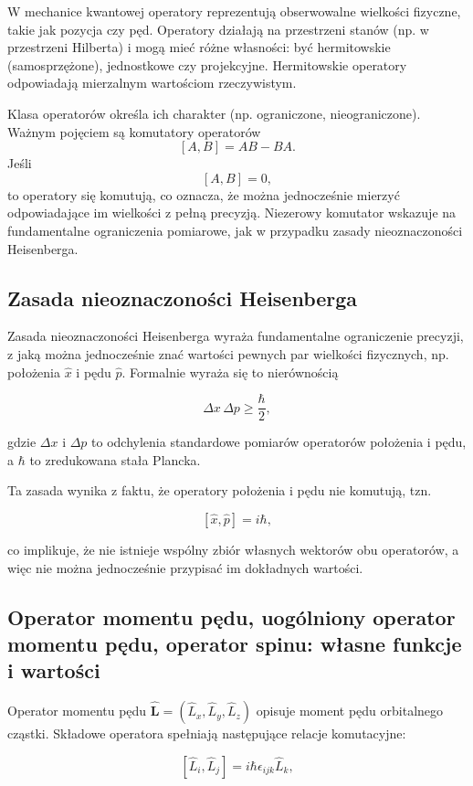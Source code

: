 W mechanice kwantowej operatory reprezentują obserwowalne wielkości fizyczne, takie jak pozycja czy pęd. Operatory działają na przestrzeni stanów (np. w przestrzeni Hilberta) i mogą mieć różne własności: być hermitowskie (samosprzężone), jednostkowe czy projekcyjne. Hermitowskie operatory odpowiadają mierzalnym wartościom rzeczywistym.

Klasa operatorów określa ich charakter (np. ograniczone, nieograniczone). Ważnym pojęciem są komutatory operatorów
\[
[A, B] = AB - BA.
\]
Jeśli
\[
[A, B] = 0,
\]
to operatory się komutują, co oznacza, że można jednocześnie mierzyć odpowiadające im wielkości z pełną precyzją. Niezerowy komutator wskazuje na fundamentalne ograniczenia pomiarowe, jak w przypadku zasady nieoznaczoności Heisenberga.

\subsection{Zasada nieoznaczoności Heisenberga}

Zasada nieoznaczoności Heisenberga wyraża fundamentalne ograniczenie precyzji, z jaką można jednocześnie znać wartości pewnych par wielkości fizycznych, np. położenia \( \hat{x} \) i pędu \( \hat{p} \). Formalnie wyraża się to nierównością

\[
\Delta x \, \Delta p \geq \frac{\hbar}{2},
\]

gdzie \( \Delta x \) i \( \Delta p \) to odchylenia standardowe pomiarów operatorów położenia i pędu, a \( \hbar \) to zredukowana stała Plancka.

Ta zasada wynika z faktu, że operatory położenia i pędu nie komutują, tzn.

\[
[\hat{x}, \hat{p}] = i \hbar,
\]

co implikuje, że nie istnieje wspólny zbiór własnych wektorów obu operatorów, a więc nie można jednocześnie przypisać im dokładnych wartości.

\subsection{Operator momentu pędu, uogólniony operator momentu pędu, operator spinu: własne funkcje i wartości}


Operator momentu pędu \(\hat{\mathbf{L}} = (\hat{L}_x, \hat{L}_y, \hat{L}_z)\) opisuje moment pędu orbitalnego cząstki. Składowe operatora spełniają następujące relacje komutacyjne:

\[
[\hat{L}_i, \hat{L}_j] = i \hbar \epsilon_{ijk} \hat{L}_k,
\]

